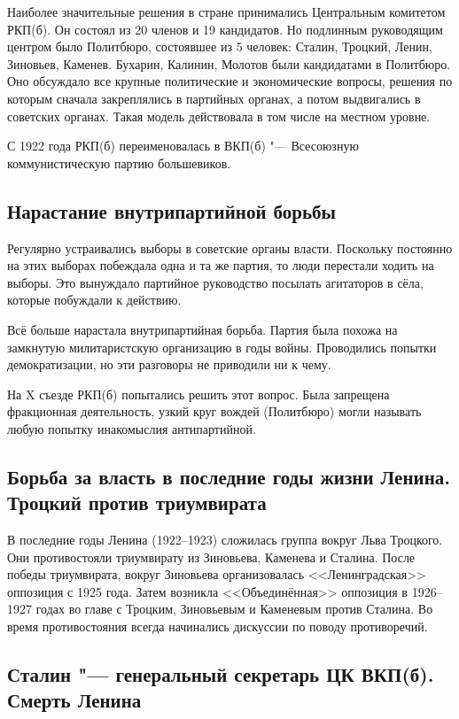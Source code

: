 Наиболее значительные решения в стране принимались Центральным комитетом РКП(б). Он состоял из 20 членов и 19 кандидатов. Но подлинным руководящим центром было Политбюро, состоявшее из 5 человек: Сталин, Троцкий, Ленин, Зиновьев, Каменев. Бухарин, Калинин, Молотов были кандидатами в Политбюро. Оно обсуждало все крупные политические и экономические вопросы, решения по которым сначала закреплялись в партийных органах, а потом выдвигались в советских органах. Такая модель действовала в том числе на местном уровне.

С 1922 года РКП(б) переименовалась в ВКП(б) "--- Всесоюзную коммунистическую партию большевиков.

\subsection{Нарастание внутрипартийной борьбы} 

Регулярно устраивались выборы в советские органы власти. Поскольку постоянно на этих выборах побеждала одна и та же партия, то люди перестали ходить на выборы. Это вынуждало партийное руководство посылать агитаторов в сёла, которые побуждали к действию.

Всё больше нарастала внутрипартийная борьба. Партия была похожа на замкнутую милитаристскую организацию в годы войны. Проводились попытки демократизации, но эти разговоры не приводили ни к чему.

На X съезде РКП(б) попытались решить этот вопрос. Была запрещена фракционная деятельность, узкий круг вождей (Политбюро) могли называть любую попытку инакомыслия антипартийной.

\subsection{Борьба за власть в последние годы жизни Ленина. Троцкий против триумвирата}

В последние годы Ленина (1922--1923) сложилась группа вокруг Льва Троцкого. Они противостояли триумвирату из Зиновьева, Каменева и Сталина. После победы триумвирата, вокруг Зиновьева организовалась <<Ленинградская>> оппозиция с 1925 года. Затем возникла <<Объединённая>> оппозиция в 1926--1927 годах во главе с Троцким, Зиновьевым и Каменевым против Сталина. Во время противостояния всегда начинались дискуссии по поводу противоречий.

\subsection{Сталин "--- генеральный секретарь ЦК ВКП(б). Смерть Ленина}

